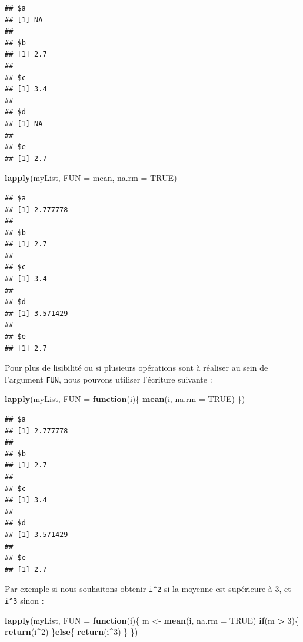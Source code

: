 \documentclass[]{book}
\newenvironment{Shaded}{\begin{snugshade}}{\end{snugshade}}
\newcommand{\ControlFlowTok}[1]{\textcolor[rgb]{0.13,0.29,0.53}{\textbf{#1}}}
\newcommand{\DataTypeTok}[1]{\textcolor[rgb]{0.13,0.29,0.53}{#1}}
\newcommand{\DecValTok}[1]{\textcolor[rgb]{0.00,0.00,0.81}{#1}}
\newcommand{\KeywordTok}[1]{\textcolor[rgb]{0.13,0.29,0.53}{\textbf{#1}}}
\newcommand{\NormalTok}[1]{#1}
\newcommand{\OperatorTok}[1]{\textcolor[rgb]{0.81,0.36,0.00}{\textbf{#1}}}
\newcommand{\OtherTok}[1]{\textcolor[rgb]{0.56,0.35,0.01}{#1}}
\newcommand{\StringTok}[1]{\textcolor[rgb]{0.31,0.60,0.02}{#1}}
\begin{document}
\begin{verbatim}
## $a
## [1] NA
## 
## $b
## [1] 2.7
## 
## $c
## [1] 3.4
## 
## $d
## [1] NA
## 
## $e
## [1] 2.7
\end{verbatim}

\begin{Shaded}
\begin{Highlighting}[]
\KeywordTok{lapply}\NormalTok{(myList, }\DataTypeTok{FUN =}\NormalTok{ mean, }\DataTypeTok{na.rm =} \OtherTok{TRUE}\NormalTok{)}
\end{Highlighting}
\end{Shaded}

\begin{verbatim}
## $a
## [1] 2.777778
## 
## $b
## [1] 2.7
## 
## $c
## [1] 3.4
## 
## $d
## [1] 3.571429
## 
## $e
## [1] 2.7
\end{verbatim}

Pour plus de lisibilité ou si plusieurs opérations sont à réaliser au sein de l'argument \texttt{FUN}, nous pouvons utiliser l'écriture suivante :

\begin{Shaded}
\begin{Highlighting}[]
\KeywordTok{lapply}\NormalTok{(myList, }\DataTypeTok{FUN =} \ControlFlowTok{function}\NormalTok{(i)\{}
  \KeywordTok{mean}\NormalTok{(i, }\DataTypeTok{na.rm =} \OtherTok{TRUE}\NormalTok{)}
\NormalTok{\})}
\end{Highlighting}
\end{Shaded}

\begin{verbatim}
## $a
## [1] 2.777778
## 
## $b
## [1] 2.7
## 
## $c
## [1] 3.4
## 
## $d
## [1] 3.571429
## 
## $e
## [1] 2.7
\end{verbatim}

Par exemple si nous souhaitons obtenir \texttt{i\^{}2} si la moyenne est supérieure à 3, et \texttt{i\^{}3} sinon :

\begin{Shaded}
\begin{Highlighting}[]
\KeywordTok{lapply}\NormalTok{(myList, }\DataTypeTok{FUN =} \ControlFlowTok{function}\NormalTok{(i)\{}
\NormalTok{  m <-}\StringTok{ }\KeywordTok{mean}\NormalTok{(i, }\DataTypeTok{na.rm =} \OtherTok{TRUE}\NormalTok{)}
  \ControlFlowTok{if}\NormalTok{(m }\OperatorTok{>}\StringTok{ }\DecValTok{3}\NormalTok{)\{}
    \KeywordTok{return}\NormalTok{(i}\OperatorTok{^}\DecValTok{2}\NormalTok{)  }
\NormalTok{  \}}\ControlFlowTok{else}\NormalTok{\{}
    \KeywordTok{return}\NormalTok{(i}\OperatorTok{^}\DecValTok{3}\NormalTok{)}
\NormalTok{  \}}
\NormalTok{\})}
\end{Highlighting}
\end{Shaded}
\end{document}
